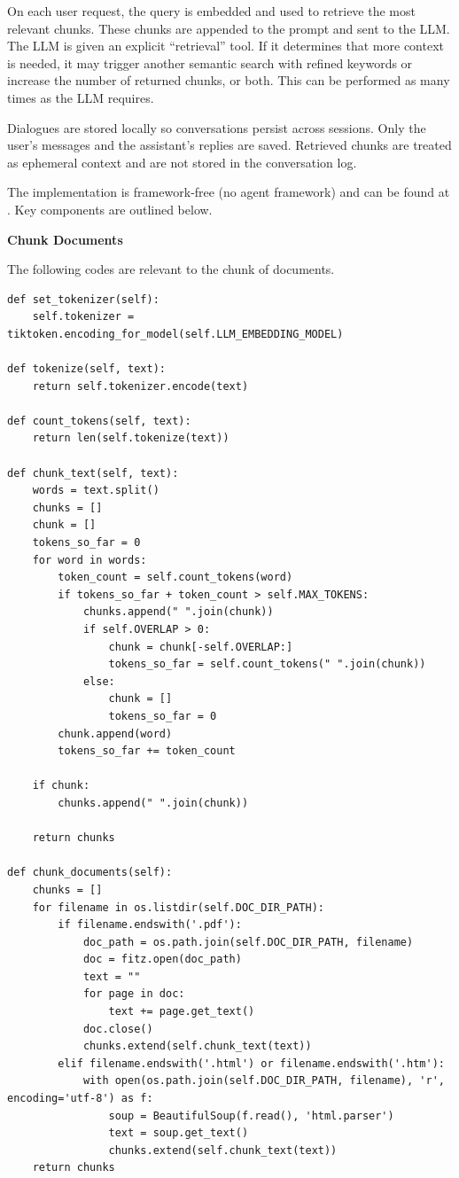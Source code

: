 On each user request, the query is embedded and used to retrieve the most relevant chunks. These chunks are appended to the prompt and sent to the LLM. The LLM is given an explicit ``retrieval'' tool. If it determines that more context is needed, it may trigger another semantic search with refined keywords or increase the number of returned chunks, or both. This can be performed as many times as the LLM requires.

Dialogues are stored locally so conversations persist across sessions. Only the user’s messages and the assistant’s replies are saved. Retrieved chunks are treated as ephemeral context and are not stored in the conversation log.

The implementation is framework‑free (no agent framework) and can be found at \cite{sun2025document}. Key components are outlined below.

\vspace{0.1in}
\noindent \textbf{Chunk Documents}
\vspace{0.1in}

The following codes are relevant to the chunk of documents.

\begin{lstlisting}
def set_tokenizer(self):
    self.tokenizer = tiktoken.encoding_for_model(self.LLM_EMBEDDING_MODEL)

def tokenize(self, text):
    return self.tokenizer.encode(text)

def count_tokens(self, text):
    return len(self.tokenize(text))

def chunk_text(self, text):
    words = text.split()
    chunks = []
    chunk = []
    tokens_so_far = 0
    for word in words:
        token_count = self.count_tokens(word)
        if tokens_so_far + token_count > self.MAX_TOKENS:
            chunks.append(" ".join(chunk))
            if self.OVERLAP > 0:
                chunk = chunk[-self.OVERLAP:]
                tokens_so_far = self.count_tokens(" ".join(chunk))
            else:
                chunk = []
                tokens_so_far = 0
        chunk.append(word)
        tokens_so_far += token_count

    if chunk:
        chunks.append(" ".join(chunk))

    return chunks

def chunk_documents(self):
    chunks = []
    for filename in os.listdir(self.DOC_DIR_PATH):
        if filename.endswith('.pdf'):
            doc_path = os.path.join(self.DOC_DIR_PATH, filename)
            doc = fitz.open(doc_path)
            text = ""
            for page in doc:
                text += page.get_text()
            doc.close()
            chunks.extend(self.chunk_text(text))
        elif filename.endswith('.html') or filename.endswith('.htm'):
            with open(os.path.join(self.DOC_DIR_PATH, filename), 'r', encoding='utf-8') as f:
                soup = BeautifulSoup(f.read(), 'html.parser')
                text = soup.get_text()
                chunks.extend(self.chunk_text(text))
    return chunks
\end{lstlisting}

